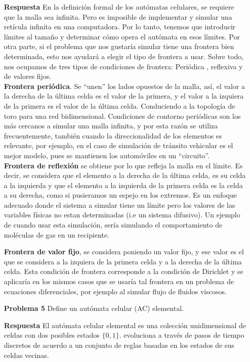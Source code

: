 \documentclass{article}
\begin{document}
\begin{enumerate}
\item[\bf{Respuesta}]En la definición formal de los autómatas celulares, se requiere que
la malla sea infinita. Pero es imposible de implementar y simular una retícula infinita en una computadora. Por lo tanto, tenemos que introducir límites al tamaño y determinar cómo opera el autómata en esos límites. Por otra parte, si el problema que nos gustaría simular tiene una frontera bien determinada, esto nos ayudará a elegir el tipo de frontera a usar. Sobre todo, nos ocupamos de tres tipos de condiciones de frontera:
Periódica , reflexiva y de valores fijos.\\

{\bf Frontera periódica}. Se ``unen'' los lados opuestos de la malla, así, el valor a la derecha de la última celda es el valor de la primera, y el valor a la izquiera de la primera es el valor de la última celda. Conduciendo a la topología de toro para una red bidimensional. Condiciones de contorno periódicas son los más cercanos a simular una malla  infinita, y por esta razón se utiliza frecuentemente, también cuando la direccionalidad de los elementos es relevante, por ejemplo, en el caso de simulación de tránsito vehicular es el mejor modelo, pues se mantienen los automóviles en un ``circuito''.\\
 

{\bf Frontera de reflexión} se obtiene por lo que refleja la malla en el límite.
Es decir, se considera que el elemento a la derecha de la última celda, es su celda a la izquierda y que el elemento a la izquierda de la primera celda es la celda a su derecha, como si pusieramos un espejo en los extremos. Es un enfoque adecuado donde el sistema a simular tiene un límite pero los valores de las variables físicas no estan determinadas (i.e un sistema difusivo). Un ejemplo de cuando usar esta simulación, sería simulando el comportamiento de moléculas de gas en un recipiente.

{\bf Frontera de valor fijo}, se considera poniendo un valor fijo, y ese valor es el que se considera a la izquiera de la primera celda y a la derecha de la última celda. Esta condición de frontera corresponde a la condición de Dirichlet y se aplicaría en los mismos casos que se usaría tal frontera en un problema de ecuaciones diferenciales, por ejemplo al simular flujo de fluidos viscosos.

\item[\bf{Problema 5}] Define un autómata celular (AC) elemental.

\item[\bf{Respuesta}] El autómata celular elemental es una colección unidimensional de celdas con dos posibles estados $\{0,1\}$. evoluciona a través de pasos de tiempo discretos de acuerdo a un conjunto de reglas basadas en los estados de sus celdas vecinas.
 


\end{enumerate}
\end{document}
